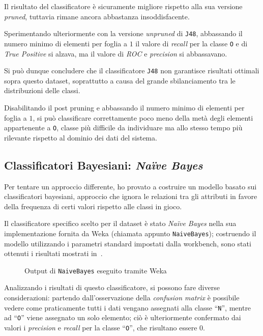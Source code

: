 Il risultato del classificatore è sicuramente migliore rispetto alla sua versione \emph{pruned}, tuttavia rimane ancora abbastanza insoddisfacente.

Sperimentando ulteriormente con la versione \emph{unpruned} di \texttt{J48},
abbassando il numero minimo di elementi per foglia a \(1\) il valore di \emph{recall} per la classe \texttt{O} e di \emph{True Positive} si alzava,
ma il valore di \emph{ROC} e \emph{precision} si abbassavano.

Si può dunque concludere che il classificatore \texttt{J48} non garantisce risultati ottimali sopra questo dataset, soprattutto a causa del grande sbilanciamento tra le distribuzioni delle classi.

Disabilitando il post pruning e abbassando il numero minimo di elementi per foglia a \(1\), si può classificare correttamente poco meno della metà degli elementi appartenente a \texttt{O},
classe più difficile da individuare ma allo stesso tempo più rilevante rispetto al dominio dei dati del sistema.

\subsection{Classificatori Bayesiani: \emph{Naïve Bayes}}\label{subsec:bayes}

Per tentare un approccio differente, ho provato a costruire un modello basato sui classificatori bayesiani,
approccio che ignora le relazioni tra gli attributi in favore della frequenza di certi valori rispetto alle classi in gioco.

Il classificatore specifico scelto per il dataset è stato \emph{Naïve Bayes} nella sua implementazione fornita da Weka (chiamata appunto \texttt{NaiveBayes});
costruendo il modello utilizzando i parametri standard impostati dalla workbench, sono stati ottenuti i risultati mostrati in~.

\begin{figure}[H]
  \centering
  \caption{Output di \texttt{NaiveBayes} eseguito tramite Weka}%
  \label{fig:bayes}
\end{figure}

Analizzando i risultati di questo classificatore, si possono fare diverse considerazioni:
partendo dall'osservazione della \emph{confusion matrix} è possibile vedere come praticamente tutti i dati vengano assegnati alla classe ``\texttt{N}'', mentre ad ``\texttt{O}'' viene assegnato un solo elemento;
ciò è ulteriormente confermato dai valori i \emph{precision} e \emph{recall} per la classe ``\texttt{O}'', che risultano essere \(0\).

